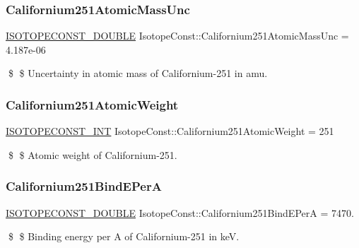 \subsubsection{\texorpdfstring{Californium251\+Atomic\+Mass\+Unc}{Californium251AtomicMassUnc}}
{\footnotesize\ttfamily \mbox{\hyperlink{group___isotope_const-_macros_ga8f45a7272ce02c0b4c65c44636ed719a}{I\+S\+O\+T\+O\+P\+E\+C\+O\+N\+S\+T\+\_\+\+D\+O\+U\+B\+LE}} Isotope\+Const\+::\+Californium251\+Atomic\+Mass\+Unc = 4.\+187e-\/06}

\$ \$ Uncertainty in atomic mass of Californium-\/251 in amu. \mbox{\label{group___isotope_const-_californium-_cf251_ga9ec084bd276ef6b6fa8087bd12742413}} 
\subsubsection{\texorpdfstring{Californium251\+Atomic\+Weight}{Californium251AtomicWeight}}
{\footnotesize\ttfamily \mbox{\hyperlink{group___isotope_const-_macros_ga5f18360b3e99483a35c32d789e62621c}{I\+S\+O\+T\+O\+P\+E\+C\+O\+N\+S\+T\+\_\+\+I\+NT}} Isotope\+Const\+::\+Californium251\+Atomic\+Weight = 251}

\$ \$ Atomic weight of Californium-\/251. \mbox{\label{group___isotope_const-_californium-_cf251_gacb6584b172f90f86c2f5a93f73a2ca49}} 
\subsubsection{\texorpdfstring{Californium251\+Bind\+E\+PerA}{Californium251BindEPerA}}
{\footnotesize\ttfamily \mbox{\hyperlink{group___isotope_const-_macros_ga8f45a7272ce02c0b4c65c44636ed719a}{I\+S\+O\+T\+O\+P\+E\+C\+O\+N\+S\+T\+\_\+\+D\+O\+U\+B\+LE}} Isotope\+Const\+::\+Californium251\+Bind\+E\+PerA = 7470.}

\$ \$ Binding energy per A of Californium-\/251 in keV. \mbox{\label{group___isotope_const-_californium-_cf251_gaca12b0d22a8d8c72e9841da2c1a95330}} 
